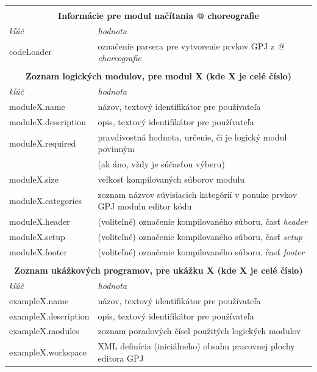 \begin{table}
\begin{tabular}{ |p{3.8cm}|p{10cm}|  }
 \multicolumn{2}{c}{} \\
 \multicolumn{2}{c}{\textbf{Informácie pre modul načítania @ choreografie}} \\
 \hline
	\textit{kľúč} & \textit{hodnota}\\
 \hline
	codeLoader&označenie parsera pre vytvorenie prvkov GPJ z \textit{@ choreografie}\\
 \hline

 \multicolumn{2}{c}{} \\
 \multicolumn{2}{c}{\textbf{Zoznam logických modulov, pre modul X (kde X je celé číslo)}} \\
 \hline
	\textit{kľúč} & \textit{hodnota}\\
 \hline
	moduleX.name&názov, textový identifikátor pre používateľa\\
	moduleX.description&opis, textový identifikátor pre používateľa\\
	moduleX.required&pravdivostná hodnota, určenie, či je logický modul povinným\\
	&(ak áno, vždy je súčasťou výberu)\\
	moduleX.size&veľkosť kompilovaných súborov modulu\\
	moduleX.categories&zoznam názvov súvisiacich kategórií v ponuke prvkov GPJ modulu editor kódu\\
	moduleX.header&(voliteľné) označenie kompilovaného súboru, časť \textit{header}\\
	moduleX.setup&(voliteľné) označenie kompilovaného súboru, časť \textit{setup}\\
	moduleX.footer&(voliteľné) označenie kompilovaného súboru, časť \textit{footer}\\
 \hline

 \multicolumn{2}{c}{} \\
 \multicolumn{2}{c}{\textbf{Zoznam ukážkových programov, pre ukážku X (kde X je celé číslo)}} \\
 \hline
	\textit{kľúč} & \textit{hodnota}\\
 \hline
	exampleX.name&názov, textový identifikátor pre používateľa\\
	exampleX.description&opis, textový identifikátor pre používateľa\\
	exampleX.modules&zoznam poradových čísel použitých logických modulov\\
	exampleX.workspace&XML definícia (iniciálneho) obsahu pracovnej plochy editora GPJ\\
 \hline
\end{tabular}
\end{table}\normalsize


